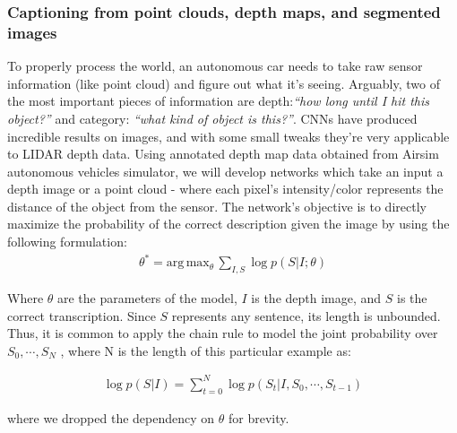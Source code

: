 \subsubsection{Captioning from point clouds, depth maps, and segmented images}
\label{subsec:point_cloud}

To properly process the world, an autonomous car needs to take raw sensor information (like point cloud) and figure out what it’s seeing.
Arguably, two of the most important pieces of information are depth:\textit{``how long until I hit this object?''} and category: \textit{``what kind of object is this?''}.
CNNs have produced incredible results on images, and with some small tweaks they’re very applicable to LIDAR depth data.
Using annotated depth map data obtained from Airsim autonomous vehicles simulator, we will develop networks which take an input a depth image or a point cloud - where each pixel's intensity/color represents the distance of the object from the sensor. 
The network's objective is to directly maximize the probability of the correct description given the image by using the following
formulation:
\begin{align}
     \theta^* = \text{arg} \, \text{max}_{\theta} \, \sum_{I,S} \log p(S|I;\theta)
\end{align}

Where $\theta$ are the parameters of the model, $I$ is the depth image, and $S$ is the correct transcription.  Since $S$ represents any sentence, its length is unbounded. Thus, it is common to apply the chain rule to model the joint probability over $S_0, \cdots, S_N$ , where N is the length of this particular example as:

\begin{align}
     \log p(S|I) = \sum_{t=0}^{N} \log p(S_t|I, S_0, \cdots, S_{t-1})
     \label{eq:joint}
\end{align}

where we dropped the dependency on $\theta$ for brevity.

